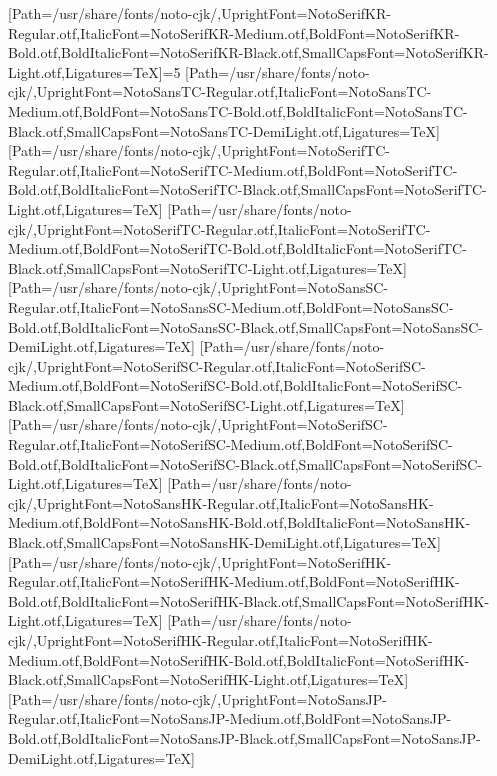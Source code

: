\newfontfamily{}[Path=/usr/share/fonts/noto-cjk/,UprightFont=NotoSerifKR-Regular.otf,ItalicFont=NotoSerifKR-Medium.otf,BoldFont=NotoSerifKR-Bold.otf,BoldItalicFont=NotoSerifKR-Black.otf,SmallCapsFont=NotoSerifKR-Light.otf,Ligatures=TeX]\else\ifnum\value{NotoCJKFamily}=5
\newfontfamily{}[Path=/usr/share/fonts/noto-cjk/,UprightFont=NotoSansTC-Regular.otf,ItalicFont=NotoSansTC-Medium.otf,BoldFont=NotoSansTC-Bold.otf,BoldItalicFont=NotoSansTC-Black.otf,SmallCapsFont=NotoSansTC-DemiLight.otf,Ligatures=TeX]
\newfontfamily{}[Path=/usr/share/fonts/noto-cjk/,UprightFont=NotoSerifTC-Regular.otf,ItalicFont=NotoSerifTC-Medium.otf,BoldFont=NotoSerifTC-Bold.otf,BoldItalicFont=NotoSerifTC-Black.otf,SmallCapsFont=NotoSerifTC-Light.otf,Ligatures=TeX]
\newfontfamily{}[Path=/usr/share/fonts/noto-cjk/,UprightFont=NotoSerifTC-Regular.otf,ItalicFont=NotoSerifTC-Medium.otf,BoldFont=NotoSerifTC-Bold.otf,BoldItalicFont=NotoSerifTC-Black.otf,SmallCapsFont=NotoSerifTC-Light.otf,Ligatures=TeX]
\newfontfamily{}[Path=/usr/share/fonts/noto-cjk/,UprightFont=NotoSansSC-Regular.otf,ItalicFont=NotoSansSC-Medium.otf,BoldFont=NotoSansSC-Bold.otf,BoldItalicFont=NotoSansSC-Black.otf,SmallCapsFont=NotoSansSC-DemiLight.otf,Ligatures=TeX]
\newfontfamily{}[Path=/usr/share/fonts/noto-cjk/,UprightFont=NotoSerifSC-Regular.otf,ItalicFont=NotoSerifSC-Medium.otf,BoldFont=NotoSerifSC-Bold.otf,BoldItalicFont=NotoSerifSC-Black.otf,SmallCapsFont=NotoSerifSC-Light.otf,Ligatures=TeX]
\newfontfamily{}[Path=/usr/share/fonts/noto-cjk/,UprightFont=NotoSerifSC-Regular.otf,ItalicFont=NotoSerifSC-Medium.otf,BoldFont=NotoSerifSC-Bold.otf,BoldItalicFont=NotoSerifSC-Black.otf,SmallCapsFont=NotoSerifSC-Light.otf,Ligatures=TeX]
\newfontfamily{}[Path=/usr/share/fonts/noto-cjk/,UprightFont=NotoSansHK-Regular.otf,ItalicFont=NotoSansHK-Medium.otf,BoldFont=NotoSansHK-Bold.otf,BoldItalicFont=NotoSansHK-Black.otf,SmallCapsFont=NotoSansHK-DemiLight.otf,Ligatures=TeX]
\newfontfamily{}[Path=/usr/share/fonts/noto-cjk/,UprightFont=NotoSerifHK-Regular.otf,ItalicFont=NotoSerifHK-Medium.otf,BoldFont=NotoSerifHK-Bold.otf,BoldItalicFont=NotoSerifHK-Black.otf,SmallCapsFont=NotoSerifHK-Light.otf,Ligatures=TeX]
\newfontfamily{}[Path=/usr/share/fonts/noto-cjk/,UprightFont=NotoSerifHK-Regular.otf,ItalicFont=NotoSerifHK-Medium.otf,BoldFont=NotoSerifHK-Bold.otf,BoldItalicFont=NotoSerifHK-Black.otf,SmallCapsFont=NotoSerifHK-Light.otf,Ligatures=TeX]
\newfontfamily{}[Path=/usr/share/fonts/noto-cjk/,UprightFont=NotoSansJP-Regular.otf,ItalicFont=NotoSansJP-Medium.otf,BoldFont=NotoSansJP-Bold.otf,BoldItalicFont=NotoSansJP-Black.otf,SmallCapsFont=NotoSansJP-DemiLight.otf,Ligatures=TeX]
